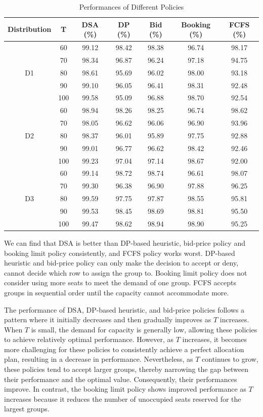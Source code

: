 \begin{table}[h]
  \centering
  \caption{Performances of Different Policies}
  \begin{tabular}{|c|c|c|c|c|c|c|}
  \hline
  Distribution & T & DSA (\%) & DP (\%) & Bid (\%) & Booking (\%) & FCFS (\%) \\
  \hline
  \multirow{5}{*}{D1} & 60   & 99.12 & 98.42 & 98.38 & 96.74 & 98.17 \\
  & 70    & 98.34 & 96.87 & 96.24 & 97.18 & 94.75 \\
  & 80    & 98.61 & 95.69 & 96.02 & 98.00 & 93.18 \\
  & 90    & 99.10 & 96.05 & 96.41 & 98.31 & 92.48 \\
  & 100   & 99.58 & 95.09 & 96.88 & 98.70 & 92.54 \\
  \hline
  \multirow{5}{*}{D2} & 60   & 98.94 & 98.26 & 98.25 & 96.74 & 98.62 \\
     & 70   & 98.05 & 96.62 & 96.06 & 96.90 & 93.96 \\
     & 80   & 98.37 & 96.01 & 95.89 & 97.75 & 92.88 \\
     & 90   & 99.01 & 96.77 & 96.62 & 98.42 & 92.46 \\
     & 100  & 99.23 & 97.04 & 97.14 & 98.67 & 92.00 \\
  \hline
  \multirow{5}{*}{D3} & 60  &  99.14 & 98.72 & 98.74 & 96.61 & 98.07 \\
     & 70  & 99.30 & 96.38 & 96.90 & 97.88 & 96.25 \\
     & 80  & 99.59 & 97.75 & 97.87 & 98.55 & 95.81 \\
     & 90  & 99.53 & 98.45 & 98.69 & 98.81 & 95.50 \\
     & 100 & 99.47 & 98.62 & 98.94 & 98.90 & 95.25 \\
  \hline
  \end{tabular}
\end{table}

We can find that DSA is better than DP-based heuristic, bid-price policy and booking limit policy consistently, and FCFS policy works worst. DP-based heuristic and bid-price policy can only make the decision to accept or deny, cannot decide which row to assign the group to. Booking limit policy does not consider using more seats to meet the demand of one group. FCFS accepts groups in sequential order until the capacity cannot accommodate more.

The performance of DSA, DP-based heuristic, and bid-price policies follows a pattern where it initially decreases and then gradually improves as $T$ increases. When $T$ is small, the demand for capacity is generally low, allowing these policies to achieve relatively optimal performance. However, as $T$ increases, it becomes more challenging for these policies to consistently achieve a perfect allocation plan, resulting in a decrease in performance. Nevertheless, as $T$ continues to grow, these policies tend to accept larger groups, thereby narrowing the gap between their performance and the optimal value. Consequently, their performances improve. In contrast, the booking limit policy shows improved performance as $T$ increases because it reduces the number of unoccupied seats reserved for the largest groups. 

